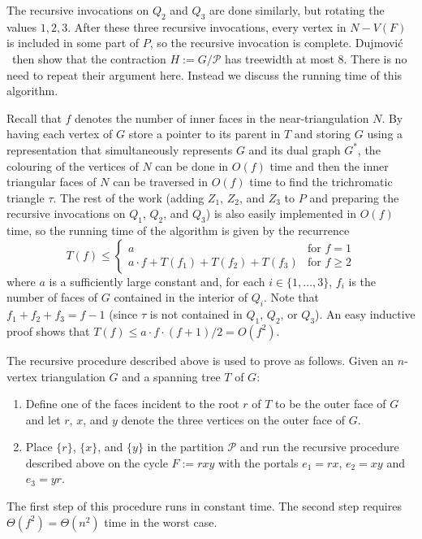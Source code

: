 \documentclass[kpfonts]{patmorin}
\let\le\leqslant
\let\ge\geqslant
\begin{document}
The recursive invocations on $Q_2$ and $Q_3$ are done similarly, but rotating the values $1,2,3$.  After these three recursive invocations, every vertex in $N-V(F)$ is included in some part of $P$, so the recursive invocation is complete.  Dujmović \etal\  then show that the contraction $H:=G/\mathcal{P}$ has treewidth at most 8. There is no need to repeat their argument here.  Instead we discuss the running time of this algorithm.

Recall that $f$ denotes the number of inner faces in the near-triangulation $N$.  By having each vertex of $G$ store a pointer to its parent in $T$ and storing $G$ using a representation that simultaneously represents $G$ and its dual graph $G^*$, the colouring of the vertices of $N$ can be done in $O(f)$ time and then the inner triangular faces of $N$ can be traversed in $O(f)$ time to find the trichromatic triangle $\tau$. The rest of the work (adding $Z_1$, $Z_2$, and $Z_3$ to $P$ and preparing the recursive invocations on $Q_1$, $Q_2$, and $Q_3$) is also easily implemented in $O(f)$ time, so the running time of the algorithm is given by the recurrence
\[  T(f) \le \begin{cases}
           a & \text{for $f=1$} \\
           a\cdot f + T(f_1)+T(f_2)+T(f_3) & \text{for $f\ge 2$}
         \end{cases}
 \]
where $a$ is a sufficiently large constant and, for each $i\in\{1,\ldots,3\}$, $f_i$ is the number of faces of $G$ contained in the interior of $Q_i$.
Note that $f_1+f_2+f_3=f-1$ (since $\tau$ is not contained in $Q_1$, $Q_2$, or $Q_3$).  An easy inductive proof shows that $T(f) \le a\cdot f\cdot (f+1)/2 = O(f^2)$.

The recursive procedure described above is used to prove  as follows.  Given an $n$-vertex triangulation $G$ and a spanning tree $T$ of $G$:
\begin{enumerate}
  \item Define one of the faces incident to the root $r$ of $T$ to be the outer face of $G$ and let $r$, $x$, and $y$ denote the three vertices on the outer face of $G$.
  \item Place $\{r\}$, $\{x\}$, and $\{y\}$ in the partition $\mathcal{P}$ and run the recursive procedure described above on the cycle $F:=rxy$ with the portals $e_1=rx$, $e_2=xy$ and $e_3=yr$.
\end{enumerate}
The first step of this procedure runs in constant time.  The second step requires $\Theta(f^2)=\Theta(n^2)$ time in the worst case.
\end{document}
